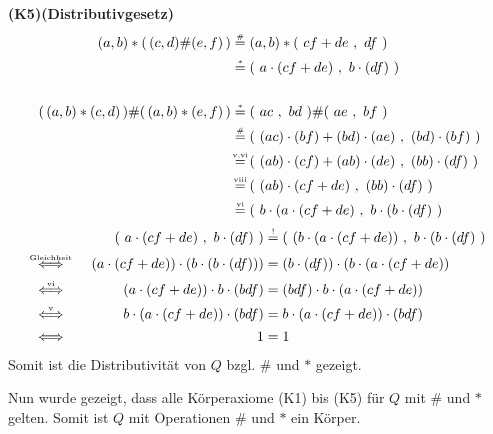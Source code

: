 \documentclass[a4paper,graphics,12pt]{article}
\newcommand{\up}[2]{\mathrel{\overset{\makebox[0pt]{\mbox{\normalfont\tiny #2}}}{#1}}}
\newcommand{\pair}[2]{(\ #1\ ,\ #2\ )}
\begin{document}
\textbf{(K5)(Distributivgesetz)}
\begin{align*}
    (a,b) * (\,(c,d) \# (e,f)\,) &\up{=}{\#} (a,b) * \pair{cf+de}{df} \\[1pt]
    &\up{=}{$*$} \pair{a\cdot (cf+de)}{b\cdot(df)} \\[15pt]
    (\,(a,b) * (c,d)\,) \# (\,(a,b) * (e,f)\,) &\up{=}{$*$} \pair{ac}{bd} \# \pair{ae}{bf} \\[1pt]
    &\up{=}{\#} \pair{(ac)\cdot (bf) + (bd)\cdot (ae)}{(bd)\cdot (bf)} \\[1pt]
    &\up{=}{v,vi} \pair{(ab)\cdot (cf) + (ab)\cdot (de)}{(bb)\cdot (df)} \\[1pt]
    &\up{=}{viii} \pair{(ab)\cdot (cf+de)}{(bb)\cdot (df)} \\[1pt]
    &\up{=}{vi} \pair{b\cdot (a\cdot (cf+de)}{b\cdot(b\cdot (df)}
\end{align*}
\begin{alignat*}{3}
    &                                       & \pair{a\cdot (cf+de)}{b\cdot(df)}
        &\up{=}{!} \pair{(b\cdot (a\cdot (cf+de))}{b\cdot(b\cdot (df)} \\[1pt]
    &\up{\Longleftrightarrow}{Gleichheit}\quad  & (a\cdot (cf+de)) \cdot (b\cdot(b\cdot (df)))
        &\up{=}{} (b \cdot (df)) \cdot (b\cdot (a\cdot (cf+de)) \\[1pt]
    &\up{\Longleftrightarrow}{vi}               & (a\cdot (cf+de)) \cdot b \cdot(bdf)
        &\up{=}{} (bdf) \cdot b\cdot (a\cdot (cf+de)) \\[1pt]
    &\up{\Longleftrightarrow}{v}                & b \cdot (a\cdot (cf+de)) \cdot(bdf)
        &\up{=}{} b\cdot (a\cdot (cf+de)) \cdot (bdf) \\[1pt]
    &\up{\Longleftrightarrow}{}                 & 1
        &= 1
\end{alignat*}
Somit ist die Distributivität von $Q$ bzgl. $\#$ und $*$ gezeigt.

Nun wurde gezeigt, dass alle Körperaxiome (K1) bis (K5) für $Q$ mit \# und $*$ gelten.
Somit ist $Q$ mit Operationen \# und $*$ ein Körper.

\newpage
\end{document}
